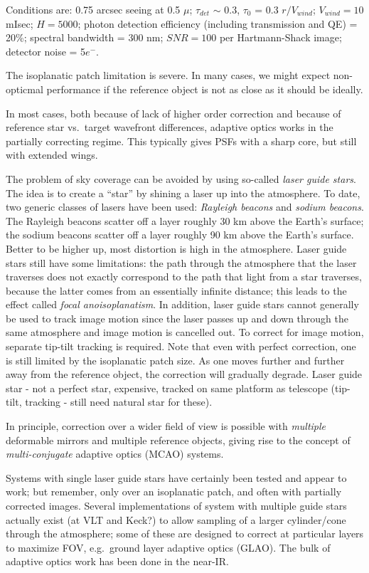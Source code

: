 \documentclass[12pt]{article}
\newcommand{\mynotes}[1]{\textcolor{myBlue}{#1}}
\begin{document}
Conditions are: 0.75 arcsec seeing at 0.5 $\mu$; $\tau_{det}$
$\sim$ 0.3, $\tau_{0}$ = 0.3 $r/V_{wind}$; $V_{wind}=10$ mIsec; $H=5000$;
photon detection efficiency (including transmission and QE) = 20\%;
spectral bandwidth = 300 nm; $SNR=100$ per Hartmann-Shack image;
detector noise = 5$e^{-}$.

The isoplanatic patch limitation is severe. In many cases, we might
expect non-opticmal performance if the reference object is not as
close as it should be ideally.

In most cases, both because of lack of higher order correction and
because of reference star vs.\ target wavefront differences, adaptive
optics works in the partially correcting regime. This typically gives
PSFs with a sharp core, but still with extended wings.

The problem of sky coverage can be avoided by using so-called \textit{laser guide
stars}. The idea is to create a ``star'' by shining a laser up into the
atmosphere. To date, two generic classes of lasers have been used:
\textit{Rayleigh beacons} and \textit{sodium beacons}. The Rayleigh beacons scatter
off a layer roughly 30 km above the Earth's surface; the sodium beacons scatter
off a layer roughly 90 km above the Earth's surface.
\mynotes{Better to be higher up, most distortion is high in the atmosphere.}
Laser guide stars still
have some limitations: the path through the atmosphere that the laser traverses
does not exactly correspond to the path that light from a star traverses,
because the latter comes from an essentially infinite distance; this leads to
the effect called \textit{focal anoisoplanatism}. In addition, laser guide
stars cannot generally be used to track image motion since the laser passes up
and down through the same atmosphere and image motion is cancelled out. To
correct for image motion, separate tip-tilt tracking is required. Note that
even with perfect correction, one is still limited by the isoplanatic patch
size. As one moves further and further away from the reference object, the
correction will gradually degrade.
\mynotes{Laser guide star - not a perfect star, expensive, tracked on
same platform as telescope (tip-tilt, tracking - still need natural
star for these).}

In principle, correction over a wider field of view is possible with
\emph{multiple} deformable mirrors and multiple reference objects, giving rise
to the concept of \textit{multi-conjugate} adaptive optics (MCAO) systems.

Systems with single laser guide stars have certainly been tested and appear to
work; but remember, only over an isoplanatic patch, and often with partially
corrected images. Several implementations of system with multiple guide stars
actually exist (at VLT and Keck?) to allow sampling of a larger cylinder/cone
through the atmosphere; some of these are designed to correct at particular
layers to maximize FOV, e.g.\ ground layer adaptive optics (GLAO). The bulk of
adaptive optics work has been done in the near-IR.
\end{document}
